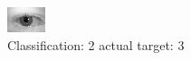 \begin{figure}[h!]
\begin{center}
\includegraphics[width=0.60\columnwidth]{figures/ID547_class_2_target_3.png}
\end{center}
\caption{ Classification: 2 actual target: 3}
\label{fig:ID547_class_2_target_3}
\end{figure}
